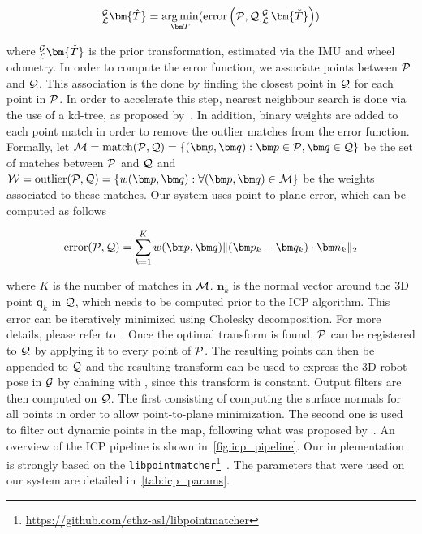 \begin{equation}
	_{\lidarf}^{\mapf}\bm{\hat{T}} = \argmin_{\bm T} (\text{error} \left(\readpc, \refpc, _{\lidarf}^{\mapf}\bm{\check{T}} \right))
\end{equation}

where $_{\lidarf}^{\mapf}\bm{\check{T}}$ is the prior transformation, estimated via the \ac{IMU} and wheel odometry.
In order to compute the error function, we associate points between $\mathcal{P}$ and $\mathcal{Q}$.
This association is the done by finding the closest point in $\mathcal{Q}$ for each point in $\mathcal{P}$.
In order to accelerate this step, nearest neighbour search is done via the use of a kd-tree, as proposed by~\citet{Elseberg2012}.
In addition, binary weights are added to each point match in order to remove the outlier matches from the error function.
Formally, let $\match = \text{match}(\readpc, \refpc) = \{(\bm p, \bm q) : \bm p \in \readpc, \bm q \in \refpc \}$ be the set of matches between $\mathcal{P}$ and $\mathcal{Q}$ and $\weight = \text{outlier}(\readpc, \refpc) = \{w(\bm p, \bm q) : \forall(\bm p, \bm q) \in \match\}$ be the weights associated to these matches.
Our system uses point-to-plane error, which can be computed as follows

\begin{equation}
	\text{error}(\readpc, \refpc) = \sum_{k=1}^{K} w(\bm p, \bm q) \lVert (\bm p_k - \bm q_k) \cdot \bm n_k \rVert_2
\end{equation}

where $K$ is the number of matches in $\mathcal{M}$. 
$\bm n_k$ is the normal vector around the 3D point $\bm q_k$ in $\mathcal{Q}$, which needs to be computed prior to the \ac{ICP} algorithm.
This error can be iteratively minimized using Cholesky decomposition.
For more details, please refer to~\citep{Pomerleau2015}.
Once the optimal transform is found, $\mathcal{P}$ can be registered to $\mathcal{Q}$ by applying it to every point of $\mathcal{P}$. 
The resulting points can then be appended to $\mathcal{Q}$ and the resulting transform \transform{\lidarf}{\mapf} can be used to express the 3D robot pose in $\mathcal{G}$ by chaining with \transform{\lidarf}{\robotf}, since this transform is constant.
Output filters are then computed on $\mathcal{Q}$. 
The first consisting of computing the surface normals for all points in order to allow point-to-plane minimization.
The second one is used to filter out dynamic points in the map, following what was proposed by~\citet{Pomerleau2014}.
An overview of the \ac{ICP} pipeline is shown in~\autoref{fig:icp_pipeline}.
Our implementation is strongly based on the \texttt{libpointmatcher}\footnote{\url{https://github.com/ethz-asl/libpointmatcher}}~\citep{Pomerleau2013}.
The parameters that were used on our system are detailed in~\autoref{tab:icp_params}.

